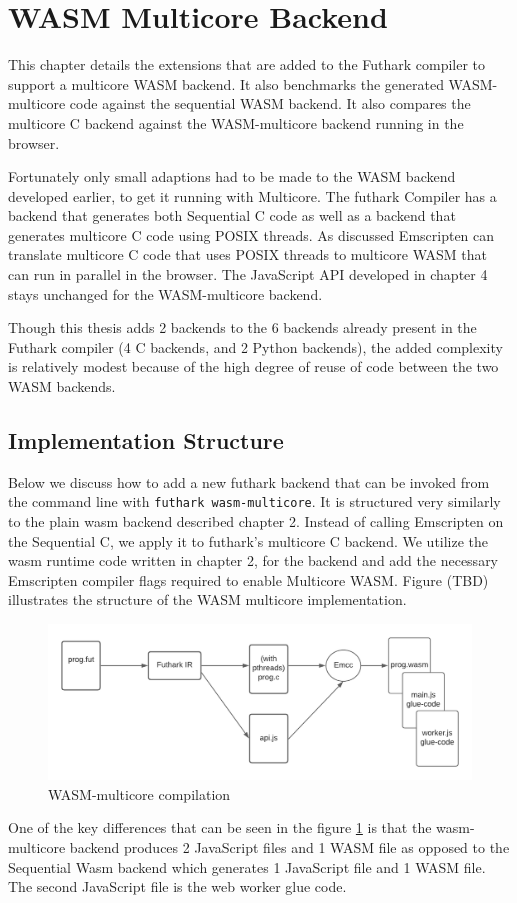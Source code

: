 \documentclass[11pt]{article}
\begin{document}
\newpage

\section{WASM Multicore Backend}

This chapter details the extensions that are added to the Futhark compiler to support a multicore WASM backend. It also benchmarks the generated WASM-multicore code against the sequential WASM backend. It also compares the multicore C backend against the WASM-multicore backend running in the browser.

Fortunately only small adaptions had to be made to the WASM backend developed earlier, to get it running with Multicore. The futhark Compiler has a backend that generates both Sequential C code as well as a backend that generates multicore C code using POSIX threads. As discussed Emscripten can translate multicore C code that uses POSIX threads to multicore WASM that can run in parallel in the browser. The JavaScript API developed in chapter 4 stays unchanged for the WASM-multicore backend. 

Though this thesis adds 2 backends to the 6 backends already present in the Futhark compiler (4 C backends, and 2 Python backends), the added complexity is relatively modest because of the high degree of reuse of code between the two WASM backends. 


\subsection{Implementation Structure}

Below we discuss how to add a new futhark backend that can be invoked from the command line with \texttt{futhark wasm-multicore}. It is structured very similarly to the plain wasm backend described chapter 2. Instead of calling Emscripten on the Sequential C, we apply it to futhark's multicore C backend. We utilize the wasm runtime code written in chapter 2, for the backend and add the necessary Emscripten compiler flags required to enable Multicore WASM. Figure (TBD) illustrates the structure of the WASM multicore implementation.

\begin{figure}[htbp]
\centerline{\includegraphics[scale=0.5]{figures/WASM_MC_compiler.png}}
\caption{WASM-multicore compilation}
\label{fig:wasm-mc}
\end{figure}
One of the key differences that can be seen in the figure \ref{fig:wasm-mc} is that the wasm-multicore backend produces 2 JavaScript files and 1 WASM file as opposed to the Sequential Wasm backend which generates 1 JavaScript file and 1 WASM file. The second JavaScript file is the web worker glue code.
\end{document}
